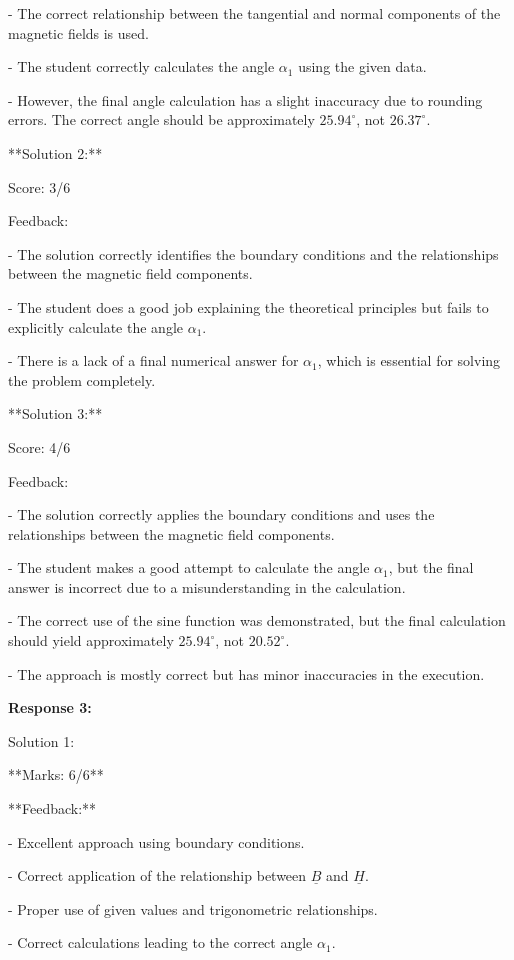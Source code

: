 \documentclass[a4paper,11pt]{article}
\begin{document}
- The correct relationship between the tangential and normal components of the magnetic fields is used.

- The student correctly calculates the angle \(\alpha_{1}\) using the given data.

- However, the final angle calculation has a slight inaccuracy due to rounding errors. The correct angle should be approximately \(25.94^\circ\), not \(26.37^\circ\).

**Solution 2:**

Score: 3/6

Feedback:

- The solution correctly identifies the boundary conditions and the relationships between the magnetic field components.

- The student does a good job explaining the theoretical principles but fails to explicitly calculate the angle \(\alpha_{1}\).

- There is a lack of a final numerical answer for \(\alpha_{1}\), which is essential for solving the problem completely.

**Solution 3:**

Score: 4/6

Feedback:

- The solution correctly applies the boundary conditions and uses the relationships between the magnetic field components.

- The student makes a good attempt to calculate the angle \(\alpha_{1}\), but the final answer is incorrect due to a misunderstanding in the calculation.

- The correct use of the sine function was demonstrated, but the final calculation should yield approximately \(25.94^\circ\), not \(20.52^\circ\).

- The approach is mostly correct but has minor inaccuracies in the execution.

\bigskip 
\textbf{Response 3:}

Solution 1: 

**Marks: 6/6**

**Feedback:**

- Excellent approach using boundary conditions.

- Correct application of the relationship between \(\underline{B}\) and \(\underline{H}\).

- Proper use of given values and trigonometric relationships.

- Correct calculations leading to the correct angle \(\alpha_{1}\).
\end{document}
